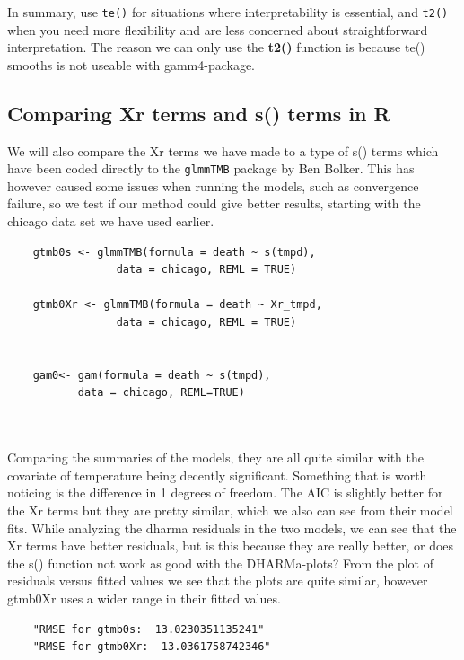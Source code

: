 In summary, use \texttt{te()} for situations where interpretability is essential, and \texttt{t2()} when you need more flexibility and are less concerned about straightforward interpretation. The reason we can only use the \textbf{t2()} function is because te() smooths is not useable with gamm4-package.




\subsection{Comparing Xr terms and s() terms in R}

We will also compare the Xr terms we have made to a type of s() terms which have been coded directly to the \texttt{glmmTMB} package by Ben Bolker. This has however caused some issues when running the models, such as convergence failure, so we test if our method could give better results, starting with the chicago data set we have used earlier.
\newline
\begin{verbatim}
    gtmb0s <- glmmTMB(formula = death ~ s(tmpd), 
                 data = chicago, REML = TRUE)

    gtmb0Xr <- glmmTMB(formula = death ~ Xr_tmpd, 
                 data = chicago, REML = TRUE)


    gam0<- gam(formula = death ~ s(tmpd), 
           data = chicago, REML=TRUE)

        
\end{verbatim}

Comparing the summaries of the models, they are all quite similar with the covariate of temperature being decently significant. Something that is worth noticing is the difference in 1 degrees of freedom. The AIC is slightly better for the Xr terms but they are pretty similar, which we also can see from their model fits.
\newline
While analyzing the dharma residuals in the two models, we can see that the Xr terms have better residuals, but is this because they are really better, or does the s() function not work as good with the DHARMa-plots? 
From the plot of residuals versus fitted values we see that the plots are quite similar, however gtmb0Xr uses a wider range in their fitted values.

\begin{verbatim}
    "RMSE for gtmb0s:  13.0230351135241"
    "RMSE for gtmb0Xr:  13.0361758742346"
\end{verbatim}

